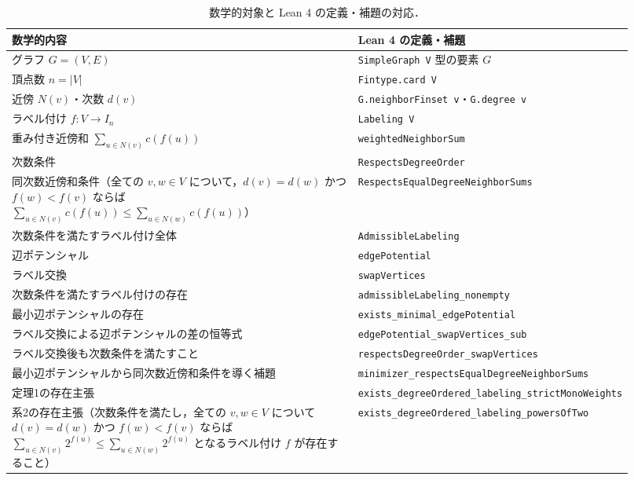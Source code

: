 \documentclass[lualatex,article]{jlreq}
\theoremstyle{jremark}
\begin{document}
\begin{table}[H]
  \centering
  \caption{数学的対象と Lean 4 の定義・補題の対応．}
  \label{tab:correspondence}
  {\small
  \renewcommand{\arraystretch}{0.75}
  \setlength{\tabcolsep}{2pt}
  \begin{tabular}{p{0.57\linewidth}p{0.35\linewidth}}
    \toprule
数学的内容 & Lean 4 の定義・補題 \\
    \midrule
    グラフ $G=(V,E)$ & \texttt{SimpleGraph V} 型の要素 $G$ \\
    頂点数 $n=|V|$ & \texttt{Fintype.card V} \\
    近傍 $N(v)$・次数 $d(v)$ & \texttt{G.neighborFinset v}・\texttt{G.degree v} \\
    ラベル付け $f:V\to I_n$ & \texttt{Labeling V} \\
    重み付き近傍和 $\textstyle\sum_{u\in N(v)}c(f(u))$ & \texttt{weightedNeighborSum} \\
    次数条件 & \texttt{RespectsDegreeOrder} \\
    同次数近傍和条件（全ての $v,w\in V$ について，$d(v)=d(w)$ かつ $f(w)<f(v)$ ならば $\textstyle\sum_{u\in N(v)}c(f(u))\leq\textstyle\sum_{u\in N(w)}c(f(u))$） & \texttt{RespectsEqualDegreeNeighborSums} \\
    次数条件を満たすラベル付け全体 & \texttt{AdmissibleLabeling} \\
    辺ポテンシャル & \texttt{edgePotential} \\
    ラベル交換 & \texttt{swapVertices} \\
    次数条件を満たすラベル付けの存在 & \texttt{admissibleLabeling\_\allowbreak{}nonempty} \\
    最小辺ポテンシャルの存在 & \texttt{exists\_\allowbreak{}minimal\_\allowbreak{}edgePotential} \\
    ラベル交換による辺ポテンシャルの差の恒等式 & \texttt{edgePotential\_\allowbreak{}swapVertices\_\allowbreak{}sub} \\
    ラベル交換後も次数条件を満たすこと & \texttt{respectsDegreeOrder\_\allowbreak{}swapVertices} \\
    最小辺ポテンシャルから同次数近傍和条件を導く補題 & \texttt{minimizer\_\allowbreak{}respectsEqualDegreeNeighborSums} \\
    定理1の存在主張 & \texttt{exists\_\allowbreak{}degreeOrdered\_\allowbreak{}labeling\_\allowbreak{}strictMonoWeights} \\
    系2の存在主張（次数条件を満たし，全ての $v,w\in V$ について $d(v)=d(w)$ かつ $f(w)<f(v)$ ならば $\textstyle\sum_{u\in N(v)}2^{f(u)}\leq\textstyle\sum_{u\in N(w)}2^{f(u)}$ となるラベル付け $f$ が存在すること） & \texttt{exists\_\allowbreak{}degreeOrdered\_\allowbreak{}labeling\_\allowbreak{}powersOfTwo} \\
    \bottomrule
  \end{tabular}
  }
\end{table}
\end{document}
